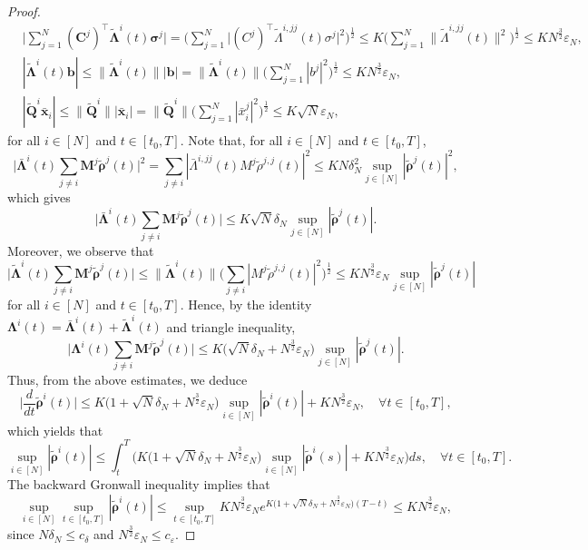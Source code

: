 \documentclass[10pt,a4paper]{amsart}
\def\wt{\widetilde}
\begin{document}
\begin{proof}
\begin{equation*}
\begin{aligned}
& \Big|\sum_{j=1}^N (\bm{C}^j)^\top \wt{\bm{\Lambda}}^i(t) \bm{\sigma}^j \Big| = \Big(\sum_{j=1}^N \big|(C^j)^\top \wt{\Lambda}^{i, jj}(t) \sigma^j \big|^2 \Big)^{\frac{1}{2}} \leq K \Big(\sum_{j=1}^N \big\| \wt{\Lambda}^{i, jj}(t) \big\|^2 \Big)^{\frac{1}{2}} \leq KN^{\frac{3}{2}} \varepsilon_N, \\
& |\wt{\bm{\Lambda}}^i(t) \bm{b}| \leq \|\wt{\bm{\Lambda}}^i(t)\| |\bm{b}| = \|\wt{\bm{\Lambda}}^i(t)\| \Big(\sum_{j=1}^{N} |b^j|^2 \Big)^{\frac{1}{2}} \leq KN^{\frac{3}{2}} \varepsilon_N, \\
& |\wt{\bm{Q}}^i \bar{\bm{x}}_i| \leq \|\wt{\bm{Q}}^i\| |\bar{\bm{x}}_i| = \|\wt{\bm{Q}}^i\| \Big(\sum_{j=1}^{N} |\bar{x}_i^j|^2 \Big)^{\frac{1}{2}} \leq K \sqrt{N} \varepsilon_N,
\end{aligned}
\end{equation*}
for all $i \in [N]$ and $t \in [t_0, T]$. Note that, for all $i \in [N]$ and $t \in [t_0, T]$,
$$\Big|\bar{\bm{\Lambda}}^i(t) \sum_{j \neq i} \bm{M}^j \wt{\bm{\rho}}^j(t)\Big|^2 = \sum_{j\neq i} |\bar{\Lambda}^{i,jj}(t) M^j \wt{\rho}^{j,j}(t)|^2 \leq KN \delta_N^2 \sup_{j \in [N]} |\wt{\bm{\rho}}^j(t)|^2,$$
which gives 
$$\Big|\bar{\bm{\Lambda}}^i(t) \sum_{j \neq i} \bm{M}^j \wt{\bm{\rho}}^j(t)\Big| \leq K\sqrt{N} \delta_N \sup_{j \in [N]} |\wt{\bm{\rho}}^j(t)|.$$
Moreover, we observe that
$$\Big|\wt{\bm{\Lambda}}^i(t) \sum_{j \neq i} \bm{M}^j \wt{\bm{\rho}}^j(t)\Big| \leq \|\wt{\bm{\Lambda}}^i(t)\| \Big(\sum_{j\neq i} |M^j \wt{\rho}^{j,j}(t)|^2 \Big)^{\frac{1}{2}} \leq K N^{\frac{3}{2}} \varepsilon_N \sup_{j \in [N]} |\wt{\bm{\rho}}^j(t)|$$
for all $i \in [N]$ and $t \in [t_0, T]$. Hence, by the identity  $\bm{\Lambda}^i(t) = \bar{\bm{\Lambda}}^i(t) + \wt{\bm{\Lambda}}^i(t)$ and triangle inequality, 
$$\Big|\bm{\Lambda}^i(t) \sum_{j \neq i} \bm{M}^j \wt{\bm{\rho}}^j(t)\Big| \leq K \big(\sqrt{N} \delta_N + N^{\frac{3}{2}} \varepsilon_N \big) \sup_{j \in [N]} |\wt{\bm{\rho}}^j(t)|.$$
Thus, from the above estimates, we deduce
$$\Big|\frac{d}{dt} \wt{\bm{\rho}}^i(t)\Big| \leq K \big(1 + \sqrt{N} \delta_N + N^{\frac{3}{2}} \varepsilon_N \big) \sup_{i \in [N]} |\wt{\bm{\rho}}^i(t)| + KN^{\frac{3}{2}} \varepsilon_N, \quad \forall t \in [t_0, T],$$
which yields that
$$\sup_{i \in [N]} |\wt{\bm{\rho}}^i(t)| \leq \int_t^T \Big(K \big(1 + \sqrt{N} \delta_N + N^{\frac{3}{2}} \varepsilon_N \big)  \sup_{i \in [N]} |\wt{\bm{\rho}}^i(s)| + KN^{\frac{3}{2}} \varepsilon_N\Big)ds, \quad \forall t \in [t_0, T].$$
The backward Gronwall inequality implies that
$$\sup_{i \in [N]} \sup_{t \in [t_0, T]} |\wt{\bm{\rho}}^i(t)| \leq \sup_{t \in [t_0, T]} KN^{\frac{3}{2}} \varepsilon_N e^{K \big(1 + \sqrt{N} \delta_N + N^{\frac{3}{2}} \varepsilon_N \big)(T-t)} \leq KN^{\frac{3}{2}} \varepsilon_N,$$
since $N \delta_N \leq c_{\delta}$ and $N^{\frac{3}{2}} \varepsilon_N \leq c_{\varepsilon}$.


\end{proof}
\end{document}
